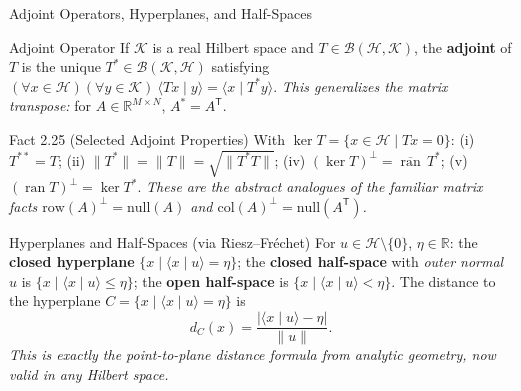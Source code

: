 \documentclass[aspectratio=169,10pt]{beamer}
\DeclareMathOperator{\ran}{ran}
\newcommand{\R}{\mathbb{R}}
\newcommand{\Hil}{\mathcal{H}}
\newcommand{\Kil}{\mathcal{K}}
\newcommand{\ip}[2]{\langle #1 \mid #2 \rangle}
\begin{document}
\begin{frame}{Adjoint Operators, Hyperplanes, and Half-Spaces}
  \begin{block}{Adjoint Operator}
    If $\Kil$ is a real Hilbert space and $T\in\mathcal B(\Hil,\Kil)$, the
    \textbf{adjoint} of $T$ is the unique $T^*\in\mathcal B(\Kil,\Hil)$
    satisfying $(\forall x\in\Hil)(\forall y\in\Kil)\ \ip{Tx}{y} =
    \ip{x}{T^*y}$. \textit{This generalizes the matrix transpose:} for
    $A\in\R^{M\times N}$, $A^*=A^{\mathsf T}$.
  \end{block}

  \begin{block}{Fact 2.25 (Selected Adjoint Properties)}
    With $\ker T = \{x\in\Hil\mid Tx=0\}$: (i) $T^{**}=T$; (ii)
    $\|T^*\|=\|T\|=\sqrt{\|T^*T\|}$; (iv) $(\ker T)^\perp =
    \overline{\ran}\,T^*$; (v) $(\ran T)^\perp = \ker T^*$. \textit{These
    are the abstract analogues of the familiar matrix facts
    $\mathrm{row}(A)^\perp = \mathrm{null}(A)$ and $\mathrm{col}(A)^\perp =
    \mathrm{null}(A^{\mathsf T})$.}
  \end{block}

  \begin{block}{Hyperplanes and Half-Spaces (via Riesz--Fr\'echet)}
    For $u\in\Hil\setminus\{0\}$, $\eta\in\R$: the \textbf{closed
    hyperplane} $\{x\mid \ip{x}{u}=\eta\}$; the \textbf{closed half-space}
    with \emph{outer normal} $u$ is $\{x\mid \ip{x}{u}\le\eta\}$; the
    \textbf{open half-space} is $\{x\mid\ip{x}{u}<\eta\}$. The distance to
    the hyperplane $C=\{x\mid\ip{x}{u}=\eta\}$ is
    \[
      d_C(x) = \frac{|\ip{x}{u}-\eta|}{\|u\|}.
    \]
    \textit{This is exactly the point-to-plane distance formula from
    analytic geometry, now valid in any Hilbert space.}
  \end{block}
\end{frame}
\end{document}
